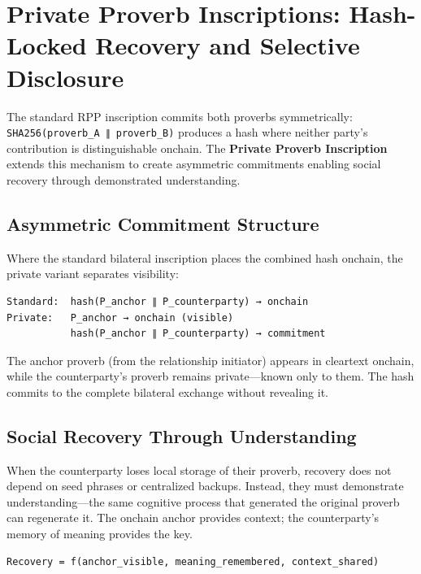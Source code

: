 \documentclass[
  11pt,
]{article}
\begin{document}
\section{Private Proverb Inscriptions: Hash-Locked Recovery and
Selective
Disclosure}\label{private-proverb-inscriptions-hash-locked-recovery-and-selective-disclosure}

The standard RPP inscription commits both proverbs symmetrically:
\texttt{SHA256(proverb\_A\ ∥\ proverb\_B)} produces a hash where neither
party's contribution is distinguishable onchain. The \textbf{Private
Proverb Inscription} extends this mechanism to create asymmetric
commitments enabling social recovery through demonstrated understanding.

\subsection{Asymmetric Commitment
Structure}\label{asymmetric-commitment-structure}

Where the standard bilateral inscription places the combined hash
onchain, the private variant separates visibility:

\begin{verbatim}
Standard:  hash(P_anchor ∥ P_counterparty) → onchain
Private:   P_anchor → onchain (visible)
           hash(P_anchor ∥ P_counterparty) → commitment
\end{verbatim}

The anchor proverb (from the relationship initiator) appears in
cleartext onchain, while the counterparty's proverb remains
private---known only to them. The hash commits to the complete bilateral
exchange without revealing it.

\subsection{Social Recovery Through
Understanding}\label{social-recovery-through-understanding}

When the counterparty loses local storage of their proverb, recovery
does not depend on seed phrases or centralized backups. Instead, they
must demonstrate understanding---the same cognitive process that
generated the original proverb can regenerate it. The onchain anchor
provides context; the counterparty's memory of meaning provides the key.

\begin{verbatim}
Recovery = f(anchor_visible, meaning_remembered, context_shared)
\end{verbatim}
\end{document}
